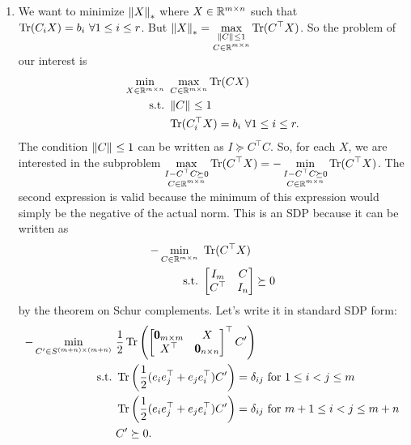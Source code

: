 \begin{enumerate}[leftmargin=*]
\item We want to minimize $\left\lVert X \right\rVert_{*}$ where $X\in \mathbb{R}^{m\times n}$ such that $\operatorname{Tr}(C_{i}X) = b_{i}~\forall 1\le i \le r$. But $\displaystyle\left\lVert X \right\rVert_{*} = \max_{\substack{\left\lVert C \right\rVert_{}\le 1 \\ C\in \mathbb{R}^{m\times n}}} \operatorname{Tr}(C^{\top}X)$. So the problem of our interest is \begin{equation}\label{minmax}\begin{aligned}
\min_{X\in\mathbb{R}^{m\times n}} &~\max_{C\in\mathbb{R}^{m\times n}} \operatorname{Tr}(CX)\\
\text{s.t.} &~ \left\lVert C \right\rVert_{} \le 1\\
&~ \operatorname{Tr}(C_{i}^{\top}X) = b_{i}~\forall 1\le i\le r.
\end{aligned}\end{equation}
The condition $\left\lVert C \right\rVert_{}\le 1$ can be written as $I \succeq C^{\top} C$. So, for each $X$, we are interested in the subproblem $\displaystyle\max_{\substack{I-C^{\top}C\succeq 0\\ C\in \mathbb{R}^{m\times n}}} \operatorname{Tr}(C^{\top}X) = -\min_{\substack{I-C^{\top}C\succeq 0\\ C\in \mathbb{R}^{m\times n}}} \operatorname{Tr}(C^{\top}X)$. The second expression is valid because the minimum of this expression would simply be the negative of the actual norm. This is an SDP because it can be written as \begin{equation}\label{primal}\begin{aligned}-\min_{C\in\mathbb{R}^{m\times n}}&~ \operatorname{Tr}(C^{\top}X)\\\text{s.t.}&~\begin{bmatrix}I_{m}&C\\C^{\top}&I_{n}\end{bmatrix}\succeq 0\end{aligned}\end{equation} by the theorem on Schur complements.  Let's write it in standard SDP form:
\begin{align*}
-\min_{C'\in S^{(m+n)\times (m+n)}}&~ \frac{1}{2}\operatorname{Tr}\left(\begin{bmatrix}\pmb 0_{m\times m}&X\\X^{\top}&\pmb0_{n\times n}\end{bmatrix}^{\top} C'\right)\\
\text{s.t.} &~ \operatorname{Tr}\left(\frac{1}{2}(e_{i}e_{j}^{\top}+e_{j}e_{i}^{\top})C'\right) = \delta_{ij} \text{ for } 1\le i<j\le m\\
&~\operatorname{Tr}\left(\frac{1}{2}(e_{i}e_{j}^{\top}+e_{j}e_{i}^{\top})C'\right) = \delta_{ij} \text{ for } m+1\le i<j\le m+n\\
&~C'\succeq 0.
\end{align*}


\end{enumerate}
